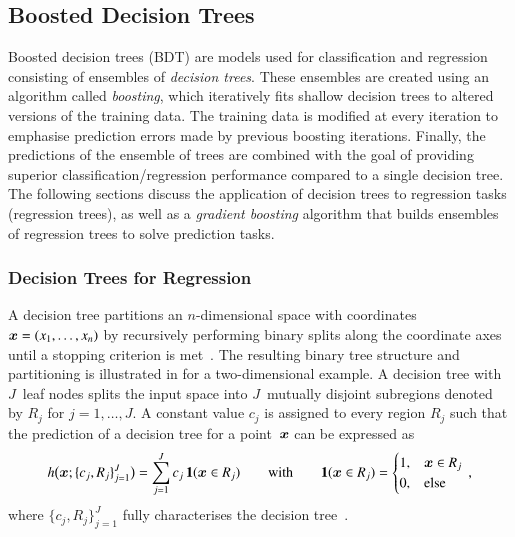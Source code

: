 \subsection{Boosted Decision Trees}%
\label{sec:bdt}

Boosted decision trees (BDT) are models used for classification and regression
consisting of ensembles of \emph{decision trees}. These ensembles are created
using an algorithm called \emph{boosting}, which iteratively fits shallow
decision trees
to altered versions of the training data. The training data is modified at every
iteration to emphasise prediction errors made by previous boosting
iterations. Finally, the predictions of the ensemble of trees are combined with
the goal of providing superior classification/regression performance compared to
a single decision tree. The following sections discuss the application of
decision trees to regression tasks (regression trees), as well as a
\emph{gradient boosting} algorithm that builds ensembles of regression trees to
solve prediction tasks.


\subsubsection{Decision Trees for Regression}

A decision tree partitions an $n$-dimensional space with coordinates
$\bm{x} = (x_1, \dots, x_n)$ by recursively performing binary splits along
the coordinate axes until a stopping criterion is
met~\cite{Breiman:1984jka,hastie09}. The resulting binary tree structure and
partitioning is illustrated in  for a two-dimensional
example. A decision tree with $J$~leaf nodes splits the input space into
$J$~mutually disjoint subregions denoted by $R_j$ for $j = 1, \dots, J$. A
constant value $c_j$ is assigned to every region $R_j$ such that the prediction
of a decision tree for a point~$\bm{x}$ can be expressed as
\begin{align*}
  h\bigl( \bm{x}; \{c_j, R_j\}_{j=1}^{J} \bigr) = \sum_{j = 1}^{J} c_j \, \mathbf{1}(\bm{x} \in R_j) \qquad \text{with} \qquad \mathbf{1}(\bm{x} \in R_j) =
  \begin{cases}
    1, & \bm{x} \in R_j \\
    0, & \text{else}
  \end{cases} \,\text{,}
\end{align*}
where $\{c_j, R_j\}_{j=1}^{J}$ fully characterises the decision
tree~\cite{hastie09}.

